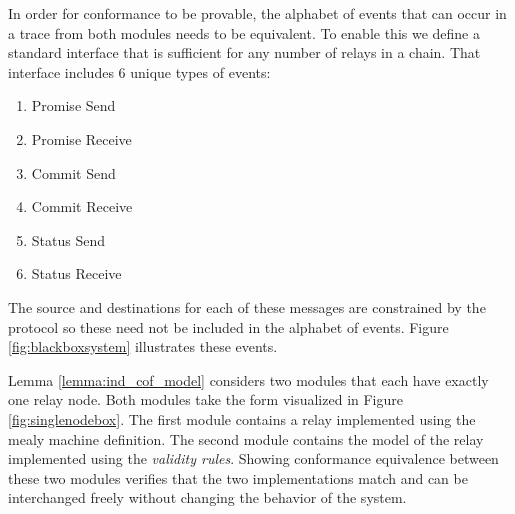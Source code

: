 \documentclass[runningheads]{llncs}
\begin{document}
In order for conformance to be provable, the alphabet of events that can occur in a trace from both modules needs to be equivalent. To enable this we define a standard interface that is sufficient for any number of relays in a chain. That interface includes 6 unique types of events:
\begin{enumerate}
    \item Promise Send
    \item Promise Receive
    \item Commit Send
    \item Commit Receive
    \item Status Send
    \item Status Receive
\end{enumerate}

The source and destinations for each of these messages are constrained by the protocol so these need not be included in the alphabet of events. Figure \ref{fig:blackboxsystem} illustrates these events.

Lemma \ref{lemma:ind_cof_model} considers two modules that each have exactly one relay node. Both modules take the form visualized in Figure \ref{fig:singlenodebox}. The first module contains a relay implemented using the mealy machine definition. The second module contains the model of the relay implemented using the \emph{validity rules}. Showing conformance equivalence between these two modules verifies that the two implementations match and can be interchanged freely without changing the behavior of the system. 
\end{document}
